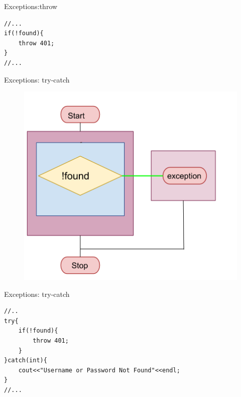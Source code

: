 \documentclass[xcolor={dvipsnames}]{beamer}
\begin{document}
\begin{frame}[fragile]{Exceptions:throw}
\begin{verbatim}
//...
if(!found){
    throw 401;
}
//...
\end{verbatim}
\end{frame}

\begin{frame}{Exceptions: try-catch}
\begin{center}	
	\begin{figure}
		\includegraphics[width=.8\textwidth]{trycatch}
	\end{figure}
\end{center}
\end{frame}


\begin{frame}[fragile]{Exceptions: try-catch}
\begin{verbatim}
//..
try{
    if(!found){
        throw 401;
    }
}catch(int){
    cout<<"Username or Password Not Found"<<endl;
}
//...
\end{verbatim}
\end{frame}
\end{document}
